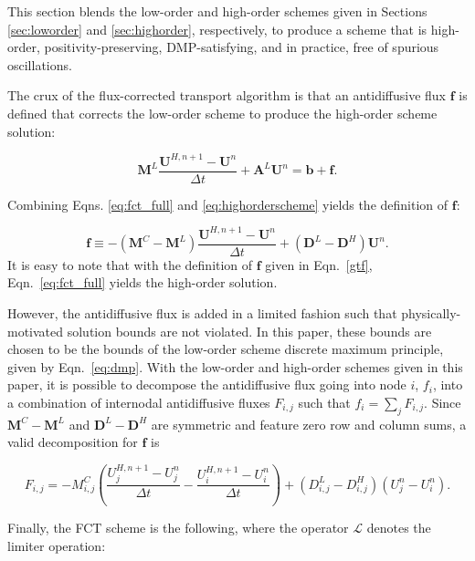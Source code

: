 This section blends the low-order and high-order schemes given
in Sections \ref{sec:loworder} and \ref{sec:highorder}, respectively, to produce a scheme
that is high-order, positivity-preserving, DMP-satisfying,
and in practice, free of spurious oscillations.

The crux of the flux-corrected transport algorithm is that an
antidiffusive flux $\mathbf{f}$ is defined that corrects the
low-order scheme to produce the high-order scheme solution:

\begin{equation}\label{eq:fct_full}
   \mathbf{M}^L\frac{\mathbf{U}^{H,n+1}-\mathbf{U}^n}{\Delta t}
      + \mathbf{A}^L\mathbf{U}^n
      = \mathbf{b} + \mathbf{f}.
\end{equation}

\noindent
Combining Eqns. \ref{eq:fct_full} and \ref{eq:highorderscheme}
yields the definition of $\mathbf{f}$:

\begin{equation}\label{gtf}
   \mathbf{f} \equiv -(\mathbf{M}^C-\mathbf{M}^L)
      \frac{\mathbf{U}^{H,n+1}-\mathbf{U}^n}{\Delta t}
      +(\mathbf{D}^L-\mathbf{D}^H)\mathbf{U}^n.
\end{equation}
It is easy to note that with the definition of $\mathbf{f}$ given in Eqn.~\ref{gtf},
Eqn.~\ref{eq:fct_full} yields the high-order solution. 

\noindent
However, the antidiffusive flux is added in a limited fashion
such that physically-motivated
solution bounds are not violated. In this paper, these bounds
are chosen to be the bounds of the low-order scheme discrete
maximum principle, given by Eqn.~\ref{eq:dmp}. With the
low-order and high-order schemes given in this paper, it
is possible to decompose the antidiffusive flux going into
node $i$, $f_i$, into a combination of internodal antidiffusive
fluxes $F_{i,j}$ such that $f_i = \sum\limits_j F_{i,j}$.
Since $\mathbf{M}^C-\mathbf{M}^L$ and $\mathbf{D}^L-\mathbf{D}^H$ are symmetric
and feature zero row and column sums, a valid decomposition for $\mathbf{f}$ is

\begin{equation}
   F_{i,j} = -M_{i,j}^C(\frac{U^{H,n+1}_j-U^n_j}{\Delta t} - \frac{U^{H,n+1}_i-U^n_i}{\Delta t})
   + (D_{i,j}^L-D_{i,j}^H)(U^n_j - U^n_i).
\end{equation}

\noindent
Finally, the FCT scheme is the following, where the operator
$\mathcal{L}$ denotes the limiter operation:

